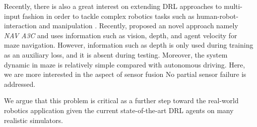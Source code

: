 \documentclass[../thesis.tex]{subfiles}
\begin{document}
Recently, there is also a great interest on extending DRL approaches to multi-input fashion in order to tackle complex robotics tasks such as human-robot-interaction \cite{qureshi2016robot} and manipulation \cite{levine2016end}. Recently, \citet{mirowski2017a} proposed an novel approach namely \textit{NAV A3C} and uses information such as vision, depth, and agent velocity for maze navigation. However, information such as depth is only used during training as an auxiliary loss, and it is absent during testing. Moreover, the system dynamic in maze is relatively simple compared with autonomous driving. Here, we are more interested 
in the aspect of sensor fusion
No partial sensor failure is addressed.


We argue that this problem is critical as a further step toward the real-world robotics application given the current state-of-the-art DRL agents on many realistic simulators. 

\end{document}
